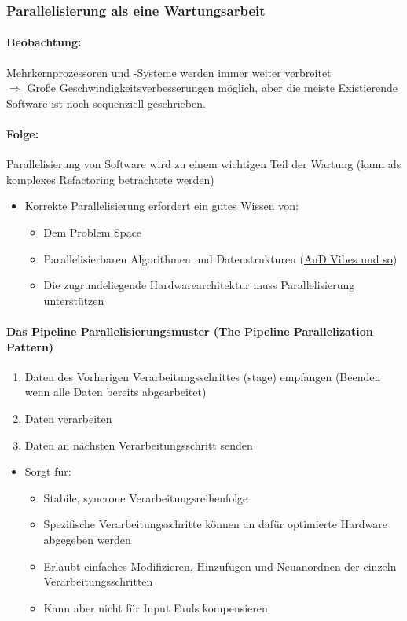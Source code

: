 \documentclass[
    ngerman,
    color=3b,
    summary,
    boxarc,
    main,
]{rubos-tuda-template}
\begin{document}
\subsubsection{Parallelisierung als eine Wartungsarbeit}
\paragraph{Beobachtung:} Mehrkernprozessoren und -Systeme werden immer weiter verbreitet\\
$\Rightarrow$ Große Geschwindigkeitsverbesserungen möglich, aber die meiste Existierende Software ist noch sequenziell geschrieben.
\paragraph{Folge:} Parallelisierung von Software wird zu einem wichtigen Teil der Wartung (kann als komplexes Refactoring betrachtete werden)

\begin{itemize}
    \item Korrekte Parallelisierung erfordert ein gutes Wissen von:\begin{itemize}
              \item Dem Problem Space
              \item Parallelisierbaren Algorithmen und Datenstrukturen (\href{https://github.com/Rdeisenroth/AuD-Zusammenfassung/blob/master/AuD-Zusammenfassung-2020.pdf}{AuD Vibes und so})
              \item Die zugrundeliegende Hardwarearchitektur muss Parallelisierung unterstützen
          \end{itemize}
\end{itemize}
\paragraph{Das Pipeline Parallelisierungsmuster (The Pipeline Parallelization Pattern)}\begin{enumerate}
    \item Daten des Vorherigen Verarbeitungsschrittes (stage) empfangen (Beenden wenn alle Daten bereits abgearbeitet)
    \item Daten verarbeiten
    \item Daten an nächsten Verarbeitungsschritt senden
\end{enumerate}
\begin{itemize}
    \item Sorgt für:\begin{itemize}
              \item Stabile, syncrone Verarbeitungsreihenfolge
              \item Spezifische Verarbeitungsschritte können an dafür optimierte Hardware abgegeben werden
              \item Erlaubt einfaches Modifizieren, Hinzufügen und Neuanordnen der einzeln Verarbeitungsschritten
              \item Kann aber nicht für Input Fauls kompensieren
          \end{itemize}
\end{itemize}
\clearpage
\end{document}
